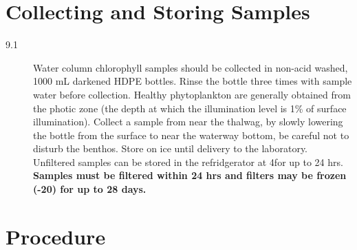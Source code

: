 \documentclass[12pt]{../SOP2}
\begin{document}
\section{Collecting and Storing Samples}
\begin{description}
\item[9.1] Water column chlorophyll samples should be collected in non-acid washed, 1000 mL darkened HDPE bottles. Rinse the bottle three times with sample water before collection. Healthy phytoplankton are generally obtained from the photic zone (the depth at which the illumination level is 1\% of surface illumination). Collect a sample from near the thalwag, by slowly lowering the bottle from the surface to near the waterway bottom, be careful not to disturb the benthos. Store on ice until delivery to the laboratory. Unfiltered samples can be stored in the refridgerator at 4\celsius for up to 24 hrs. \textbf{Samples must be filtered within 24 hrs and filters may be frozen (-20\celsius) for up to 28 days.}
\end{description}
\section{Procedure}
\end{document}
